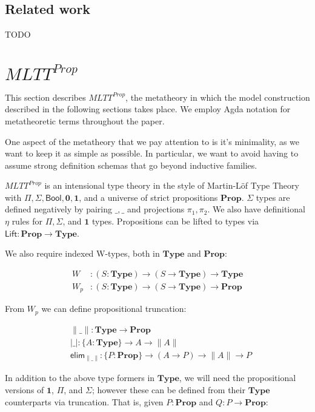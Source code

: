 \documentclass{easychair}
\newcommand{\mType}{\mathbf{Type}}
\newcommand{\mProp}{\mathbf{Prop}}
\begin{document}
\subsection{Related work}

TODO

\section{$MLTT^{Prop}$}\label{metatheory}

This section describes $MLTT^{Prop}$, the metatheory in which the model
construction described in the following sections takes place. We employ Agda
notation for metatheoretic terms throughout the paper.

One aspect of the metatheory that we pay attention to is it's minimality, as we
want to keep it as simple as possible. In particular, we want to avoid having to
assume strong definition schemas that go beyond inductive families.

$MLTT^{Prop}$ is an intensional type theory in the style of Martin-L\"of Type
Theory with $\Pi, \Sigma, \textsf{Bool}, \mathbf{0}, \mathbf{1}$, and a universe
of strict propositions $\mProp$. $\Sigma$ types are defined negatively by
pairing $\_,\_$ and projections $\pi_1, \pi_2$. We also have definitional $\eta$
rules for $\Pi, \Sigma$, and $\mathbf{1}$ types. Propositions can be lifted to
types via $\textsf{Lift} : \mProp \to \mType$.


We also require indexed W-types, both in $\mType$ and $\mProp$:

\begin{align*}
  W & : (S : \mType) \to (S \to \mType) \to \mType \\
  W_p & : (S : \mType) \to (S \to \mType) \to \mProp
\end{align*}

From $W_p$ we can define propositional truncation:

\begin{align*}
  & \|\_\| : \mType \to \mProp \\
  & |\_| : \{A : \mType \} \to A \to \| A \| \\
  & \textsf{elim}_{\|\_\|} : \{P : \mProp \} \to (A \to P) \to \| A \| \to P
\end{align*}

In addition to the above type formers in $\mType$, we will need the
propositional versions of $\mathbf{1}$, $\Pi$, and $\Sigma$; however these can
be defined from their $\mType$ counterparts via truncation. That is, given $P :
\mProp$ and $Q : P \to \mProp$:
\end{document}
